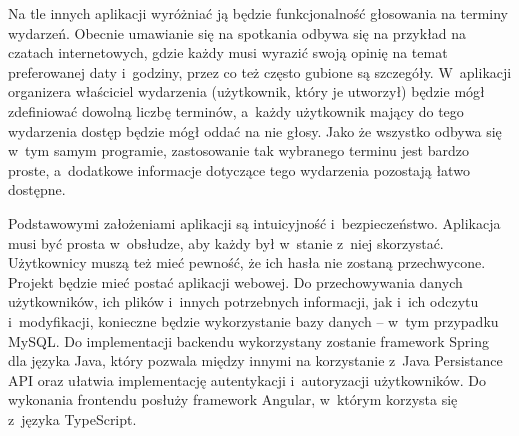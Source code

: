 \documentclass[a4paper,twoside,12pt]{book}
\begin{document}
Na tle innych aplikacji wyróżniać ją będzie funkcjonalność głosowania na terminy wydarzeń. Obecnie umawianie się na spotkania odbywa się na przykład na czatach internetowych, gdzie każdy musi wyrazić swoją opinię na temat preferowanej daty i~godziny, przez co też często gubione są szczegóły. W~aplikacji organizera właściciel wydarzenia (użytkownik, który je utworzył) będzie mógł zdefiniować dowolną liczbę terminów, a~każdy użytkownik mający do tego wydarzenia dostęp będzie mógł oddać na nie głosy. Jako że wszystko odbywa się w~tym samym programie, zastosowanie tak wybranego terminu jest bardzo proste, a~dodatkowe informacje dotyczące tego wydarzenia pozostają łatwo dostępne.

Podstawowymi założeniami aplikacji są intuicyjność i~bezpieczeństwo. Aplikacja musi być prosta w~obsłudze, aby każdy był w~stanie z~niej skorzystać. Użytkownicy muszą też mieć pewność, że ich hasła nie zostaną przechwycone.
%
Projekt będzie mieć postać aplikacji webowej. Do przechowywania danych użytkowników, ich plików i~innych potrzebnych informacji, jak i~ich odczytu i~modyfikacji, konieczne będzie wykorzystanie bazy danych -- w~tym przypadku MySQL. Do implementacji backendu wykorzystany zostanie framework Spring dla języka Java, który pozwala między innymi na korzystanie z~Java Persistance API oraz ułatwia implementację autentykacji i~autoryzacji użytkowników. Do wykonania frontendu posłuży framework Angular, w~którym korzysta się z~języka TypeScript.



\end{document}
